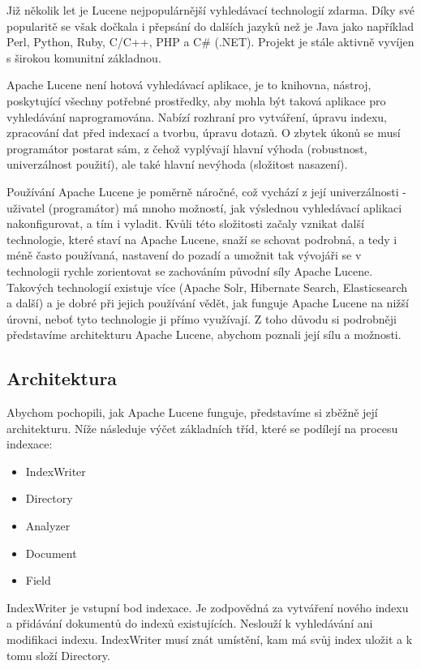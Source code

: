 \documentclass[11pt,draft,oneside]{fithesis2}
\begin{document}
Již několik let je Lucene nejpopulárnější vyhledávací technologií zdarma. Díky své popularitě se však dočkala i přepsání do dalších jazyků než je Java jako například Perl, Python, Ruby, C/C++, PHP a C\# (.NET). Projekt je stále aktivně vyvíjen s širokou komunitní základnou.

Apache Lucene není hotová vyhledávací aplikace, je to knihovna, nástroj, poskytující všechny potřebné prostředky, aby mohla být taková aplikace pro vyhledávání naprogramována. Nabízí rozhraní pro vytváření, úpravu indexu, zpracování dat před indexací a tvorbu, úpravu dotazů. O zbytek úkonů se musí programátor postarat sám, z čehož vyplývají hlavní výhoda (robustnost, univerzálnost použití), ale také hlavní nevýhoda (složitost nasazení).

Používání Apache Lucene je poměrně náročné, což vychází z její univerzálnosti - uživatel (programátor) má mnoho možností, jak výslednou vyhledávací aplikaci nakonfigurovat, a tím i vyladit. Kvůli této složitosti
začaly vznikat další technologie, které staví na Apache Lucene, snaží se schovat podrobná, a tedy i méně často používaná, nastavení do pozadí a umožnit tak vývojáři se v technologii rychle zorientovat se 
zachováním původní síly Apache Lucene. Takových technologií existuje více (Apache Solr, Hibernate Search, Elasticsearch a další) a je dobré při jejich používání vědět, jak funguje Apache Lucene na nižší úrovni, neboť tyto technologie ji přímo využívají. Z toho důvodu si podrobněji představíme architekturu Apache Lucene, abychom poznali její sílu a možnosti.

\subsection{Architektura}
Abychom pochopili, jak Apache Lucene funguje, představíme si zběžně její architekturu. Níže následuje výčet základních tříd, které se podílejí na procesu indexace:
\begin{itemize}
	\item IndexWriter
	\item Directory
	\item Analyzer
	\item Document
	\item Field
\end{itemize}

IndexWriter je vstupní bod indexace. Je zodpovědná za vytváření nového indexu a přidávání dokumentů do indexů existujících. Neslouží k vyhledávání ani modifikaci indexu. IndexWriter musí znát umístění, kam má svůj index uložit
a k tomu složí Directory. 
\end{document}
